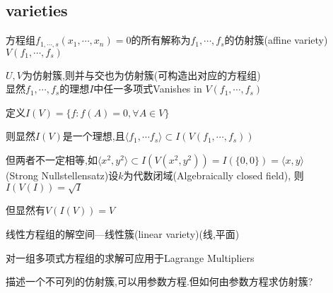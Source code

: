 \subsection{varieties}
方程组$ f_{1,\cdots,s}(x_1,\cdots,x_n)=0$的所有解称为$ f_1,\cdots,f_s$的仿射簇(affine variety)$ V(f_1,\cdots,f_s)$

$ U,V$为仿射簇,则并与交也为仿射簇(可构造出对应的方程组)
\\

显然$ f_1,\cdots,f_s$的理想$ I$中任一多项式Vanishes in $ V(f_1,\cdots,f_s)$

定义$ I(V)=\{f:f(A)=0 ,\forall A \in V\}$

则显然$ I(V)$是一个理想,且$  \langle f_1,\cdots f_s \rangle  \subset I(V(f_1,\cdots,f_s))$

但两者不一定相等,如$  \langle x^2,y^2 \rangle \subset I(V(x^2,y^2))=I(\{0,0\})= \langle x,y \rangle $
\\

(Strong Nullstellensatz)设$ k$为代数闭域(Algebraically closed field),
则$ I(V(I))=\sqrt{I}$

但显然有$ V(I(V))=V$

线性方程组的解空间---线性簇(linear variety)(线,平面)

对一组多项式方程组的求解可应用于Lagrange Multipliers

描述一个不可列的仿射簇,可以用参数方程.但如何由参数方程求仿射簇?

